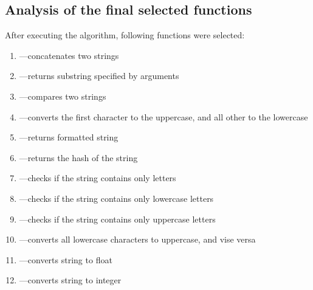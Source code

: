 \documentclass[11pt,nonacm,natbib=false]{acmart}
\begin{document}
\subsection{Analysis of the final selected functions}
After executing the algorithm, following functions were selected:
\begin{enumerate}
    \item {}---concatenates two strings
    \item {}---returns substring specified by arguments
    \item {}---compares two strings
    \item {}---converts the first character to the uppercase, and all other to the lowercase
    \item {}---returns formatted string
    \item {}---returns the hash of the string
    \item {}---checks if the string contains only letters
    \item {}---checks if the string contains only lowercase letters
    \item {}---checks if the string contains only uppercase letters
    \item {}---converts all lowercase characters to uppercase, and vise versa
    \item {}---converts string to float
    \item {}---converts string to integer
\end{enumerate}
\end{document}
